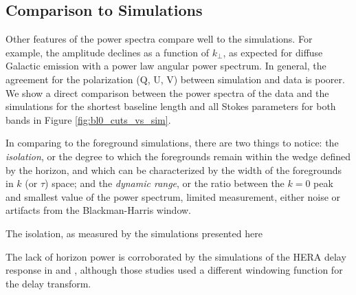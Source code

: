 \documentclass[twocolumn, trackchanges]{aastex61}
\begin{document}
{\subsection{Comparison to Simulations}

Other features of the power spectra compare well to the simulations.  For example, the amplitude declines as a function of $k_\perp$, as expected for diffuse Galactic emission with a power law angular power spectrum.  In general, the agreement for the polarization (Q, U, V) between simulation and data is poorer.  We show a direct comparison between the power spectra of the data and the simulations for the shortest baseline length and all Stokes parameters for both bands in Figure \ref{fig:bl0_cuts_vs_sim}.

In comparing to the foreground simulations, there are two things to notice: the {\it isolation}, or the degree to which the foregrounds remain within the wedge defined by the horizon, and which can be characterized by the width of the foregrounds in $k$ (or $\tau$) space; and the {\it dynamic range}, or the ratio between the $k=0$ peak and smallest value of the power spectrum, limited measurement, either noise or artifacts from the Blackman-Harris window.}



The isolation, as measured by the simulations presented here

The lack of horizon power is corroborated by the simulations of the HERA delay response in \cite{Ewall-Wice.16} and \cite{Thyagarajan.16}, although those studies used a different windowing function for the delay transform. 
\end{document}
